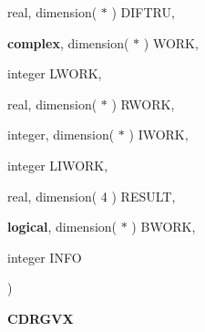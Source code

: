 {\begin{DoxyParamCaption}
\item[{real, dimension( $\ast$ )}]{D\+I\+F\+T\+R\+U, }
\item[{{\bf complex}, dimension( $\ast$ )}]{W\+O\+R\+K, }
\item[{integer}]{L\+W\+O\+R\+K, }
\item[{real, dimension( $\ast$ )}]{R\+W\+O\+R\+K, }
\item[{integer, dimension( $\ast$ )}]{I\+W\+O\+R\+K, }
\item[{integer}]{L\+I\+W\+O\+R\+K, }
\item[{real, dimension( 4 )}]{R\+E\+S\+U\+L\+T, }
\item[{{\bf logical}, dimension( $\ast$ )}]{B\+W\+O\+R\+K, }
\item[{integer}]{I\+N\+F\+O}
\end{DoxyParamCaption}
)}\label{group__complex__eig_gac4baee2f642cf143c6b713d3f12e56bf}


{\bfseries C\+D\+R\+G\+V\+X} 

